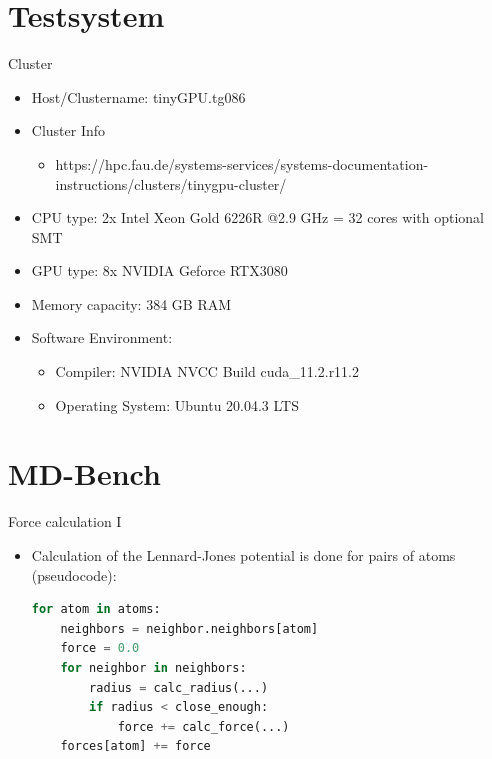 \documentclass[12pt,xcolor={rgb},t]{beamer}
\begin{document}
\section{Testsystem}

\begin{frame}[fragile]{Cluster}

    \begin{itemize}
        \item Host/Clustername: tinyGPU.tg086
        \item Cluster Info
        \begin{itemize}
            \item https://hpc.fau.de/systems-services/systems-documentation-instructions/clusters/tinygpu-cluster/
        \end{itemize}
        \item CPU type: 2x Intel Xeon Gold 6226R @2.9 GHz = 32 cores with optional SMT
        \item GPU type: 8x NVIDIA Geforce RTX3080
        \item Memory capacity: 384 GB RAM
        \item Software Environment:
        \begin{itemize}
            \item Compiler: NVIDIA NVCC Build cuda\_11.2.r11.2
            \item Operating System: Ubuntu 20.04.3 LTS
        \end{itemize}
    \end{itemize}

\end{frame}

\section{MD-Bench}

\begin{frame}[fragile]{Force calculation I}

    \begin{itemize}
        \item Calculation of the Lennard-Jones potential is done for pairs of atoms (pseudocode):
\begin{lstlisting}[basicstyle=\footnotesize, language=Python]
for atom in atoms:
    neighbors = neighbor.neighbors[atom]
    force = 0.0
    for neighbor in neighbors:
        radius = calc_radius(...)
        if radius < close_enough:
            force += calc_force(...)
    forces[atom] += force
\end{lstlisting}
    \end{itemize}
    
\end{frame}
\end{document}
